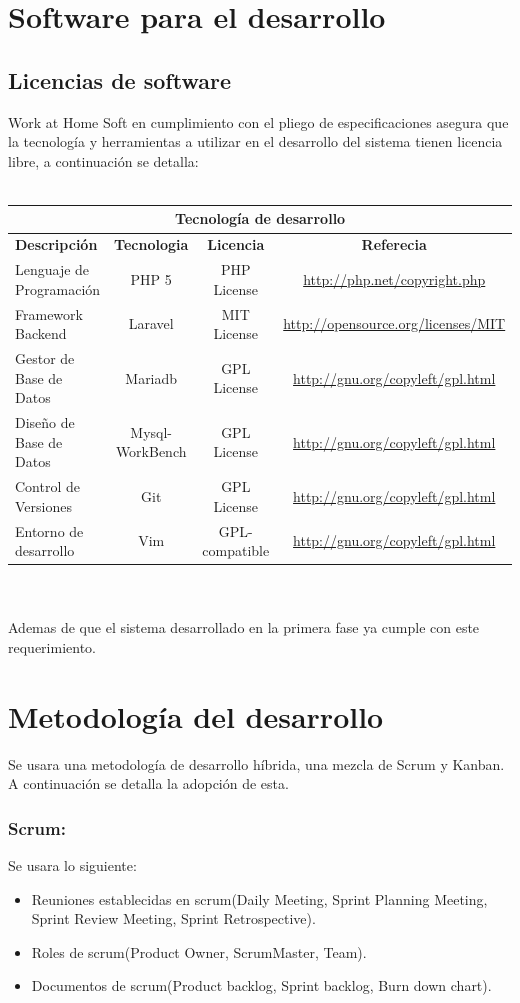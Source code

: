 \documentclass[11pt,letterpaper]{report}
\begin{document}
\section{Software para el desarrollo}
\subsection{Licencias de software}
Work at Home Soft en cumplimiento con el pliego de especificaciones asegura que la tecnología y herramientas a utilizar  en el desarrollo del sistema tienen licencia libre, a continuación se detalla:\\
\\
\begin{tabular}{ lccc }
	\multicolumn{4}{c}{\textbf{Tecnología de desarrollo}} \\
	\hline
	\textbf{Descripción} & \textbf{Tecnologia} & \textbf{Licencia} & \textbf{Referecia} \\ \hline
	Lenguaje de Programación & PHP 5 & PHP License & \url{http://php.net/copyright.php}\\
	Framework Backend & Laravel & MIT License & \url{http://opensource.org/licenses/MIT} \\  
	Gestor de Base de Datos & Mariadb & GPL License & \url{http://gnu.org/copyleft/gpl.html} \\
	Diseño de Base de Datos & Mysql-WorkBench & GPL License & \url{http://gnu.org/copyleft/gpl.html}\\
	Control de Versiones & Git & GPL License & \url{http://gnu.org/copyleft/gpl.html}\\
	Entorno de desarrollo & Vim & GPL-compatible & \url{http://gnu.org/copyleft/gpl.html}\\
	
	
\end{tabular}
\\
\\Ademas de que el sistema desarrollado en la primera fase ya cumple con este requerimiento.
\section{Metodología del desarrollo}
Se usara una metodología de desarrollo híbrida, una mezcla de Scrum y Kanban.\\
A continuación se detalla la adopción de esta.
\subsubsection{Scrum:} 
Se usara lo siguiente:
\begin{itemize}
	\item Reuniones establecidas en scrum(Daily Meeting, Sprint Planning Meeting, Sprint Review Meeting, Sprint Retrospective).
	\item Roles de scrum(Product Owner, ScrumMaster, Team).
	\item Documentos de scrum(Product backlog, Sprint backlog, Burn down chart).
\end{itemize}
\end{document}
